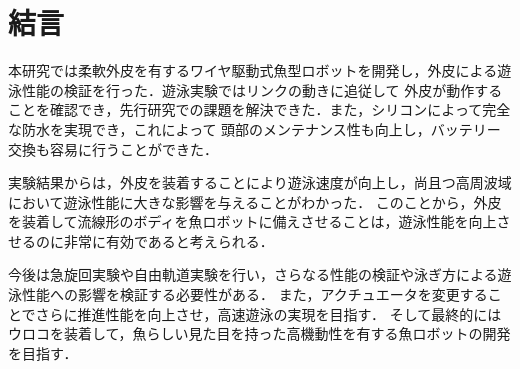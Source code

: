\newpage
\section{結言}
本研究では柔軟外皮を有するワイヤ駆動式魚型ロボットを開発し，外皮による遊泳性能の検証を行った．遊泳実験ではリンクの動きに追従して
外皮が動作することを確認でき，先行研究\cite{kyu}での課題を解決できた．また，シリコンによって完全な防水を実現でき，これによって
頭部のメンテナンス性も向上し，バッテリー交換も容易に行うことができた．

実験結果からは，外皮を装着することにより遊泳速度が向上し，尚且つ高周波域において遊泳性能に大きな影響を与えることがわかった．
このことから，外皮を装着して流線形のボディを魚ロボットに備えさせることは，遊泳性能を向上させるのに非常に有効であると考えられる．

今後は急旋回実験や自由軌道実験を行い，さらなる性能の検証や泳ぎ方による遊泳性能への影響を検証する必要性がある．
また，アクチュエータを変更することでさらに推進性能を向上させ，高速遊泳の実現を目指す．
そして最終的にはウロコを装着して，魚らしい見た目を持った高機動性を有する魚ロボットの開発を目指す．
